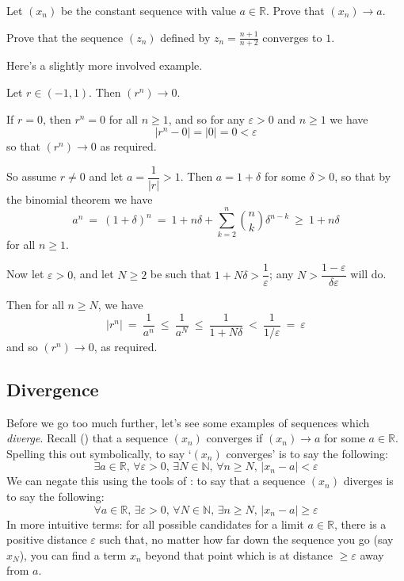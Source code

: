 \begin{exercise}
Let $(x_n)$ be the constant sequence with value $a \in \mathbb{R}$. Prove that $(x_n) \to a$.
\end{exercise}

\begin{exercise}
Prove that the sequence $(z_n)$ defined by $z_n=\frac{n+1}{n+2}$ converges to $1$.
\end{exercise}

Here's a slightly more involved example.

\begin{proposition}
\label{propPowerOfRTendsToZero}
Let $r \in (-1, 1)$. Then $(r^n) \to 0$.
\end{proposition}

\begin{cproof}
If $r=0$, then $r^n = 0$ for all $n \ge 1$, and so for any $\varepsilon > 0$ and $n \ge 1$ we have
\[ |r^n - 0| = |0| = 0 < \varepsilon \]
so that $(r^n) \to 0$ as required.

So assume $r \ne 0$ and let $a = \dfrac{1}{|r|} > 1$. Then $a = 1 + \delta$ for some $\delta > 0$, so that by the binomial theorem we have
\[ a^n ~=~ (1+\delta)^n ~=~ 1+n\delta + \sum_{k=2}^n \binom{n}{k} \delta^{n-k} ~\ge~ 1+n\delta \]
for all $n \ge 1$.

Now let $\varepsilon > 0$, and let $N \ge 2$ be such that $1+N\delta > \dfrac{1}{\varepsilon}$; any $N > \dfrac{1-\varepsilon}{\delta \varepsilon}$ will do.

Then for all $n \ge N$, we have
\[ |r^n| ~=~ \frac{1}{a^n} ~\le~ \frac{1}{a^N} ~\le~ \frac{1}{1+N\delta} ~<~ \frac{1}{1/\varepsilon} ~=~ \varepsilon \]
and so $(r^n) \to 0$, as required.
\end{cproof}

\subsection*{Divergence}

Before we go too much further, let's see some examples of sequences which \textit{diverge}. Recall () that a sequence $(x_n)$ converges if $(x_n) \to a$ for some $a \in \mathbb{R}$. Spelling this out symbolically, to say `$(x_n)$ converges' is to say the following:
\[ \exists a \in \mathbb{R},\, \forall \varepsilon > 0,\, \exists N \in \mathbb{N},\, \forall n \ge N,\, |x_n-a|<\varepsilon \]
We can negate this using the tools of : to say that a sequence $(x_n)$ diverges is to say the following:
\[ \forall a \in \mathbb{R},\, \exists \varepsilon > 0,\, \forall N \in \mathbb{N},\, \exists n \ge N,\, |x_n-a| \ge \varepsilon \]
In more intuitive terms: for all possible candidates for a limit $a \in \mathbb{R}$, there is a positive distance $\varepsilon$ such that, no matter how far down the sequence you go (say $x_N$), you can find a term $x_n$ beyond that point which is at distance $\ge \varepsilon$ away from $a$.


